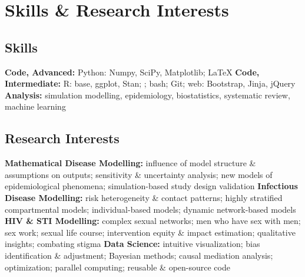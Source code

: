 \section{Skills \& Research Interests}\nodate
\subsection{Skills}
\bullet \textbf{Code, Advanced:} Python: Numpy, SciPy, Matplotlib; \LaTeX
\bullet \textbf{Code, Intermediate:} R: base, ggplot, Stan; \matlab; bash; Git; web: Bootstrap, Jinja, jQuery
\bullet \textbf{Analysis:} simulation modelling, epidemiology, biostatistics, systematic review, machine learning
\subsection{Research Interests}\nodate
\bullet \textbf{Mathematical Disease Modelling:}
        influence of model structure \& assumptions on outputs;
        sensitivity \& uncertainty analysis;
        new models of epidemiological phenomena;
        simulation-based study design validation
\bullet \textbf{Infectious Disease Modelling:}
        risk heterogeneity \& contact patterns;
        highly stratified compartmental models;
        individual-based models;
        dynamic network-based models
\bullet \textbf{HIV \& STI Modelling:}
        complex sexual networks;
        men who have sex with men;
        sex work;
        sexual life course;
        intervention equity \& impact estimation;
        qualitative insights;
        combating stigma
\bullet \textbf{Data Science:}
        intuitive visualization;
        bias identification \& adjustment;
        Bayesian methods;
        causal mediation analysis;
        optimization;
        parallel computing;
        reusable \& open-source code
